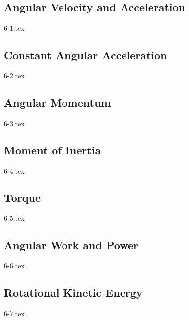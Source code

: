 \subsection{Angular Velocity and Acceleration}

{6-1.tex}

\subsection{Constant Angular Acceleration}

{6-2.tex}

\subsection{Angular Momentum}

{6-3.tex}

\subsection{Moment of Inertia}

{6-4.tex}

\subsection{Torque}

{6-5.tex}

\subsection{Angular Work and Power}

{6-6.tex}

\subsection{Rotational Kinetic Energy} 

{6-7.tex}